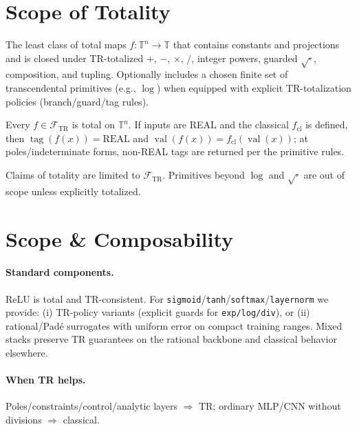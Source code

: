 \documentclass[twoside,11pt]{article}
\begin{document}
\section*{Scope of Totality}
\label{sec:totality}
\begin{definition}\label{def:FTR}
The least class of total maps \(f:\mathbb{T}^n\to\mathbb{T}\) that contains constants and projections and is closed under TR-totalized \(+,\,-,\,\times,\,/\), integer powers, guarded \(\sqrt{\cdot}\), composition, and tupling. Optionally includes a chosen finite set of transcendental primitives (e.g., \(\log\)) when equipped with explicit TR-totalization policies (branch/guard/tag rules).
\end{definition}
\begin{proposition}\label{prop:totality}
Every \(f\in\mathcal{F}_{\!\mathrm{TR}}\) is total on \(\mathbb{T}^n\). If inputs are REAL and the classical \(f_{\mathrm{cl}}\) is defined, then \(\operatorname{tag}(f(x))=\mathrm{REAL}\) and \(\operatorname{val}(f(x))=f_{\mathrm{cl}}(\operatorname{val}(x))\); at poles/indeterminate forms, non-REAL tags are returned per the primitive rules.
\end{proposition}
\begin{remark}[Transcendentals]
Claims of totality are limited to \(\mathcal{F}_{\!\mathrm{TR}}\). Primitives beyond \(\log\) and \(\sqrt{\cdot}\) are out of scope unless explicitly totalized.
\end{remark}

\section*{Scope \& Composability}
\label{sec:scope-composability}
\paragraph{Standard components.} ReLU is total and TR-consistent. For \texttt{sigmoid}/\texttt{tanh}/\texttt{softmax}/\texttt{layernorm} we provide: (i) TR-policy variants (explicit guards for \texttt{exp/log/div}), or (ii) rational/Pad\'e surrogates with uniform error on compact training ranges. Mixed stacks preserve TR guarantees on the rational backbone and classical behavior elsewhere.
\paragraph{When TR helps.} Poles/constraints/control/analytic layers \(\Rightarrow\) TR; ordinary MLP/CNN without divisions \(\Rightarrow\) classical.
\end{document}
